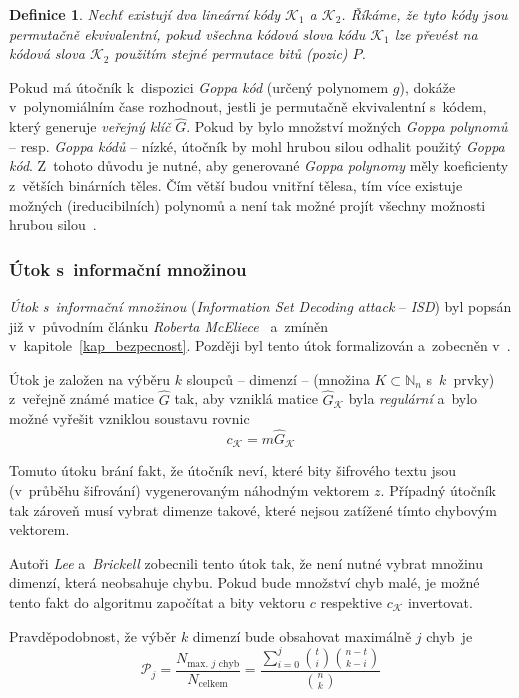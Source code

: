 \documentclass[thesis=M,czech,hidelinks]{FITthesis}[2012/06/26]
\newcommand{\0}{{\textcolor[gray]{0.75}{0}}}
\newtheorem{definice}{Definice}
\begin{document}
\begin{definice}
    Nechť existují dva lineární kódy $\mathcal{K}_1$ a $\mathcal{K}_2$. Říkáme,
    že tyto kódy jsou \emph{permutačně ekvivalentní}, pokud všechna kódová slova
    kódu $\mathcal{K}_1$ lze převést na kódová slova $\mathcal{K}_2$ použitím
    stejné permutace bitů (pozic) $P$.
\end{definice}

Pokud má útočník k~dispozici \emph{Goppa kód} (určený polynomem $g$), dokáže
v~polynomiálním čase rozhodnout, jestli je permutačně ekvivalentní s~kódem,
který generuje \emph{veřejný klíč} $\hat{G}$. Pokud by bylo množství možných
\emph{Goppa polynomů} -- resp. \emph{Goppa kódů} -- nízké, útočník by mohl
hrubou silou odhalit použitý \emph{Goppa kód}. Z~tohoto důvodu je nutné, aby
generované \emph{Goppa polynomy} měly koeficienty z~větších binárních těles. Čím
větší budou vnitřní tělesa, tím více existuje možných (ireducibilních) polynomů
a není tak možné projít všechny možnosti hrubou silou~\cite{Repka}.


\subsubsection{Útok s~informační množinou}

\emph{Útok s~informační množinou} (\emph{Information Set Decoding attack} --
\emph{ISD}) byl popsán již v~původním článku \emph{Roberta
McEliece}~\cite{McEliece} a~zmíněn v~kapitole~\ref{kap_bezpecnost}. Později byl
tento útok formalizován a~zobecněn v~\cite{Lee}.

Útok je založen na výběru $k$ sloupců -- dimenzí -- (množina
$K\subset\mathbb{N}_n$ s~$k$~prvky) z~veřejně známé matice $\hat{G}$ tak, aby
vzniklá matice $\hat{G}_{\mathcal{K}}$ byla \emph{regulární} a~bylo možné
vyřešit vzniklou soustavu rovnic
$$ c_{\mathcal{K}} = m \hat{G}_{\mathcal{K}} $$

Tomuto útoku brání fakt, že útočník neví, které bity šifrového textu jsou
(v~průběhu šifrování)  vygenerovaným náhodným vektorem $z$.
Případný útočník tak zároveň musí vybrat dimenze takové, které nejsou zatížené
tímto chybovým vektorem.

Autoři \emph{Lee} a~\emph{Brickell} zobecnili tento útok tak, že není nutné
vybrat množinu dimenzí, která neobsahuje chybu. Pokud bude množství chyb malé,
je možné tento fakt do algoritmu započítat a bity vektoru $c$ respektive
$c_{\mathcal{K}}$ invertovat.

Pravděpodobnost, že výběr $k$ dimenzí bude obsahovat maximálně $j$ chyb~je
$$
    \mathcal{P}_j= \frac{N_{\text{max. $j$ chyb}}}{N_{\text{celkem}}}
    = \frac{\sum_{i=0}^{j}\binom{t}{i}\binom{n-t}{k-i}}{\binom{n}{k}}
$$
\end{document}
